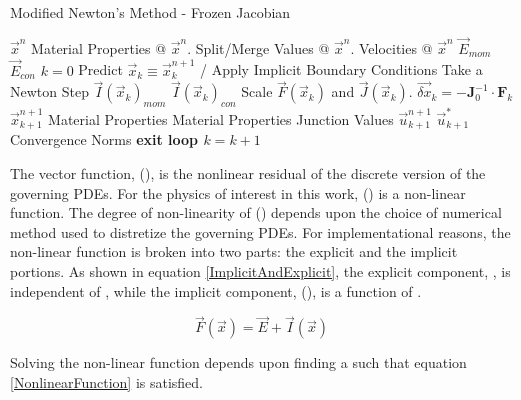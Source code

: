 \begin{algorithm}
\setlength{\baselineskip}{0.625\baselineskip}
\label{ModifiedNewtonsAlgorithm}
\caption{Modified Newton's Method - Frozen Jacobian}
\begin{algorithmic}[1]
\Define $\vec{x}^{n}$
\Calculate Material Properties @ $\vec{x}^{n}$.
\Calculate Split/Merge Values @ $\vec{x}^{n}$.
\Calculate Velocities @ $\vec{x}^{n}$
\Calculate $\vec{E}_{mom}$
\Calculate $\vec{E}_{con}$
\Set $k = 0$
\BlackBox Predict $\vec{x}_{k} \equiv \vec{x}^{n+1}_{k}$ / Apply Implicit Boundary Conditions
\Loop \quad Take a Newton Step
  \Calculate $\vec{I}(\vec{x}_{k})_{mom}$
  \Calculate $\vec{I}(\vec{x}_{k})_{con}$
  \BlackBox Scale $\vec{F}(\vec{x}_k)$ and $\vec{J}(\vec{x}_{k})$.
  \BlackBox $\Vec{\delta x}_k = -\mathbf{J}^{-1}_0\cdot \mathbf{F}_k$ 
  \BlackBox $\Vec{x}^{n+1}_{k+1}$ 
  \Update Material Properties 
  \Test Material Properties
  \Update Junction Values 
  \Update $\vec{u}^{n+1}_{k+1}$ 
  \Update $\Vec{u}^{*}_{k+1}$ 
  \Calculate Convergence Norms
    \State \bf{exit loop}
  \EndIf
\EndLoop \quad $k = k+1$
\end{algorithmic}
\end{algorithm}



The vector function, (), is the nonlinear residual of the discrete version of the governing PDEs.
For the physics of interest in this work, () is a non-linear function.
The degree of non-linearity of () depends upon the choice of numerical method used to distretize the governing PDEs.
For implementational reasons, the non-linear function is broken into two parts: the explicit and the implicit portions.
As shown in equation \eqref{ImplicitAndExplicit}, the explicit component, , is independent of , while the implicit component, (), is a function of .

\begin{equation}
\label{ImplicitAndExplicit}
\Vec{F}(\Vec{x}) = \Vec{E} + \Vec{I}(\Vec{x})
\end{equation}

Solving the non-linear function depends upon finding a  such that equation \eqref{NonlinearFunction} is satisfied.

